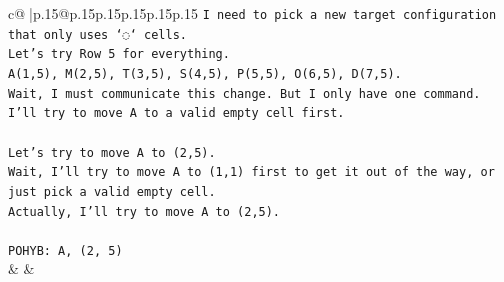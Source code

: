 \documentclass{article}
\begin{document}
{\begin{supertabular}{c@{$\;$}|p{.15\linewidth}@{}p{.15\linewidth}p{.15\linewidth}p{.15\linewidth}p{.15\linewidth}p{.15\linewidth}}
{{{\texttt{I need to pick a new target configuration that only uses `◌` cells.} \\
\texttt{Let's try Row 5 for everything.} \\
\texttt{A(1,5), M(2,5), T(3,5), S(4,5), P(5,5), O(6,5), D(7,5).} \\
\texttt{Wait, I must communicate this change. But I only have one command. I'll try to move A to a valid empty cell first.} \\
\\ 
\texttt{Let's try to move A to (2,5).} \\
\texttt{Wait, I'll try to move A to (1,1) first to get it out of the way, or just pick a valid empty cell.} \\
\texttt{Actually, I'll try to move A to (2,5).} \\
\\ 
\texttt{POHYB: A, (2, 5)} \\
            }
        }
    }
    & & \\ \\


\end{supertabular}}
\end{document}
